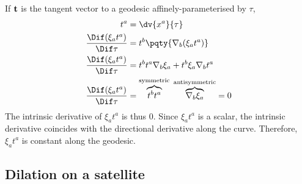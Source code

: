 \documentclass[12pt]{article}
\begin{document}
        If \(\bf t\) is the tangent vector to a geodesic affinely-parameterised by \(\tau\), \begin{align*}
            t^a &= \dv{x^a}{\tau}\\
            \frac{\Dif (\xi_a t^a)}{\Dif  \tau} &= t^b  \pqty{\nabla_b (\xi_a t^a)}\\
            \frac{\Dif (\xi_a t^a)}{\Dif  \tau} &= t^b t^a\nabla_b \xi_a + t^b \xi_a \nabla_b t^a\\
            \frac{\Dif (\xi_a t^a)}{\Dif  \tau} &= \overbrace{t^b t^a}^\text{symmetric} \;\overbrace{\nabla_b \xi_a}^\text{antisymmetric} = 0
        \end{align*}
        The intrinsic derivative of \(\xi_a t^a\) is thus \(0\). Since \(\xi_a t^a\) is a scalar, the intrinsic derivative coincides with the directional derivative along the curve. Therefore, \(\xi_a t^a\) is constant along the geodesic.
        \subsection{Dilation on a satellite}
\end{document}
